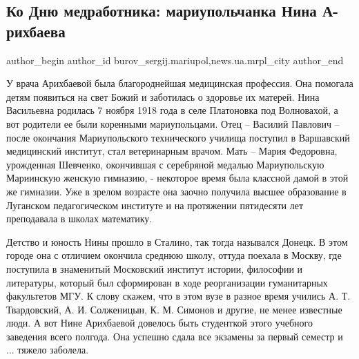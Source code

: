  
 
 
 
 
 
\subsection{Ко Дню медработника: мариупольчанка Нина А\hyp{}рихбаева}
\label{sec:15_06_2019.stz.news.ua.mrpl_city.1.ko_dnju_medrabotnika_mariupolchanka_nina_arihbajeva}
 
\ifcmt
 author_begin
   author_id burov_sergij.mariupol,news.ua.mrpl_city
 author_end
\fi


У врача Арихбаевой была благороднейшая медицинская профессия. Она помогала
детям появиться на свет Божий и заботилась о здоровье их матерей. Нина
Васильевна родилась 7 ноября 1918 года в селе Платоновка под Волновахой, а вот
родители ее были коренными мариупольцами. Отец – Василий Павлович – после
окончания Мариупольского технического училища поступил в Варшавский медицинский
институт, стал ветеринарным врачом. Мать – Мария Федоровна, урожденная
Шевченко, окончившая с серебряной медалью Мариупольскую Мариинскую женскую
гимназию, - некоторое время была классной дамой в этой же гимназии. Уже в
зрелом возрасте она заочно получила высшее образование в Луганском
педагогическом институте и на протяжении пятидесяти лет преподавала в школах
математику.

Детство и юность Нины прошло в Сталино, так тогда назывался Донецк. В этом
городе она с отличием окончила среднюю школу, оттуда поехала в Москву, где
поступила в знаменитый Московский институт истории, философии и литературы,
который был сформирован в ходе реорганизации гуманитарных факультетов МГУ. К
слову скажем, что в этом вузе в разное время учились А. Т. Твардовский, А. И.
Солженицын, К. М. Симонов и другие, не менее известные люди. А вот Нине
Арихбаевой довелось быть студенткой этого учебного заведения всего полгода. Она
успешно сдала все экзамены за первый семестр и ... тяжело заболела.

